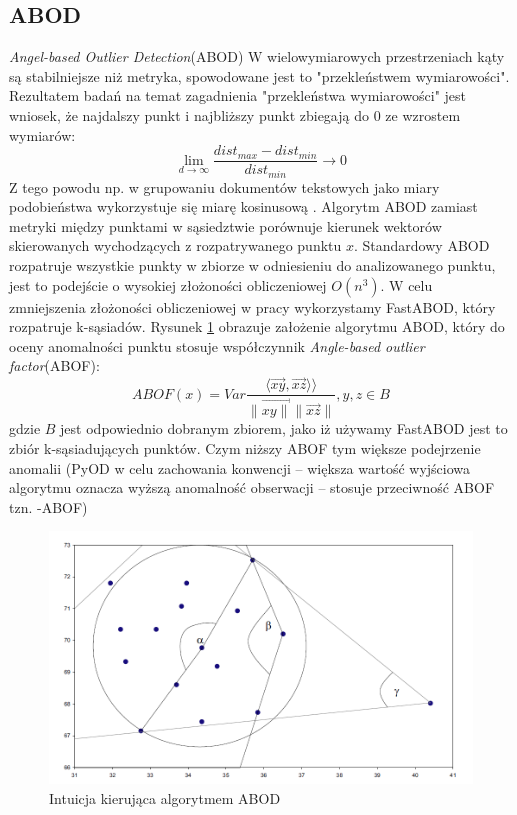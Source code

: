 \subsection{ABOD}
\textit{Angel-based Outlier Detection}(ABOD) \cite{abod} W wielowymiarowych przestrzeniach kąty są stabilniejsze niż metryka, spowodowane jest to "przekleństwem wymiarowości". Rezultatem badań na temat zagadnienia "przekleństwa wymiarowości"\cite{curse} jest wniosek, że najdalszy punkt i najbliższy punkt zbiegają do 0 ze wzrostem wymiarów:
\begin{equation}
\lim_{d\to\infty} \frac{dist_{max} - dist_{min}}{dist_{min}} \longrightarrow 0
\end{equation}
Z tego powodu np. w grupowaniu dokumentów tekstowych jako miary podobieństwa wykorzystuje się miarę kosinusową \cite{huang2008similarity}. Algorytm ABOD zamiast metryki między punktami w sąsiedztwie porównuje kierunek wektorów skierowanych wychodzących z rozpatrywanego punktu $x$. Standardowy ABOD rozpatruje wszystkie punkty w zbiorze w odniesieniu do analizowanego punktu, jest to podejście o wysokiej złożoności obliczeniowej $O(n^3)$. W celu zmniejszenia złożoności obliczeniowej w pracy wykorzystamy FastABOD, który rozpatruje k-sąsiadów. Rysunek \ref{fig:abod} obrazuje założenie algorytmu ABOD, który do oceny anomalności punktu stosuje współczynnik \textit{Angle-based outlier factor}(ABOF):
\begin{equation}
    ABOF(x) = Var\frac{\langle \overrightarrow{xy}, \overrightarrow{xz} \rangle⟩}{\big\| \overrightarrow{xy\big\|}\big\| \overrightarrow{xz}\big\|},y,z \in B
\end{equation}
gdzie $B$ jest odpowiednio dobranym zbiorem, jako iż używamy FastABOD jest to zbiór k-sąsiadujących punktów. Czym niższy ABOF tym większe podejrzenie anomalii (PyOD w celu zachowania konwencji -- większa wartość wyjściowa algorytmu oznacza wyższą anomalność obserwacji -- stosuje przeciwność ABOF tzn. -ABOF)
\begin{figure}
    \centering
    \includegraphics[width=.8\textwidth]{chapters/MetaOD/images/abod.png}
    \caption{Intuicja kierująca algorytmem ABOD \cite{abod}}
    \label{fig:abod}
\end{figure}

